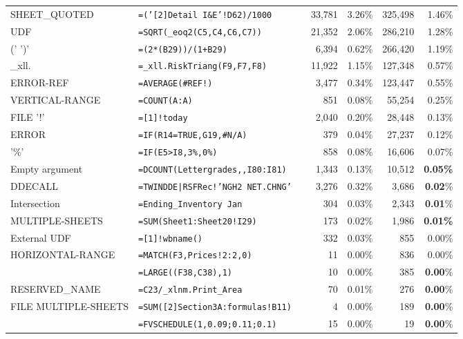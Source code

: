 \begin{tabular}{llrrrrr}
			SHEET_QUOTED & \texttt{=('[2]Detail I\&E'!D62)/1000} &  & 33,781 & 3.26\% & 325,498 & 1.46\%\\
			UDF & \texttt{=SQRT(_eoq2(C5,C4,C6,C7))} &  & 21,352 & 2.06\% & {286,210} & {1.28\%}\\
			(' \synt{Reference} ')' & \texttt{=(2*(B29))/(1+B29)} &  & 6,394 & 0.62\% & 266,420 & 1.19\%\\
			_xll. & \texttt{=_xll.RiskTriang(F9,F7,F8)} &  & 11,922 & 1.15\% & 127,348 & {0.57\%}\\
			ERROR-REF & \texttt{=AVERAGE(\#REF!)} &  & 3,477 & 0.34\% & 123,447 & {0.55\%}\\
			VERTICAL-RANGE & \texttt{=COUNT(A:A)} &  & 851 & 0.08\% & 55,254 & {0.25\%}\\
			FILE '!' & \texttt{=[1]!today} &  & 2,040 & 0.20\% & {28,448} & {0.13\%}\\
			ERROR & \texttt{=IF(R14=TRUE,G19,\#N/A)} &  & 379 & 0.04\% & 27,237 & {0.12\%}\\
			'\%' & \texttt{=IF(E5>I8,3\%,0\%)} &  & 858 & 0.08\% & 16,606 & 0.07\%\\
				Empty argument & \texttt{=DCOUNT(Lettergrades,,I80:I81)} &  & 1,343 & 0.13\% & 10,512 & \textbf{0.05\%}\\
				DDECALL & \texttt{=TWINDDE|RSFRec!'NGH2 NET.CHNG'} &  & 3,276 & 0.32\% & {3,686} & \textbf{0.02}\%\\
				Intersection & \texttt{=Ending_Inventory Jan} &  & 304 & 0.03\% & {2,343} & \textbf{0.01}\%\\
				MULTIPLE-SHEETS & \texttt{=SUM(Sheet1:Sheet20!I29)} &  & 173 & 0.02\% & {1,986} & \textbf{0.01\%}\\
				External UDF & \texttt{=[1]!wbname()} &  & 332 & 0.03\% & {855} & 0.00\%\\
				HORIZONTAL-RANGE & \texttt{=MATCH(F3,Prices!2:2,0)} &  & 11 & 0.00\% & 836 & {0.00\%}\\
				\synt{Union} & \texttt{=LARGE((F38,C38),1)} &  & 10 & 0.00\% & {385} & \textbf{0.00}\%\\
				RESERVED_NAME & \texttt{=C23/_xlnm.Print_Area} &  & 70 & 0.01\% & {276} & \textbf{0.00}\%\\
				FILE MULTIPLE-SHEETS & \texttt{=SUM([2]Section3A:formulas!B11)} &  & 4 & 0.00\% & 189 & \textbf{0.00}\%\\
				\synt{ConstantArray} & \texttt{=FVSCHEDULE(1,{0.09;0.11;0.1})} &  & 15 & 0.00\% & {19} & \textbf{0.00}\%\\
			\hline
	\end{tabular}